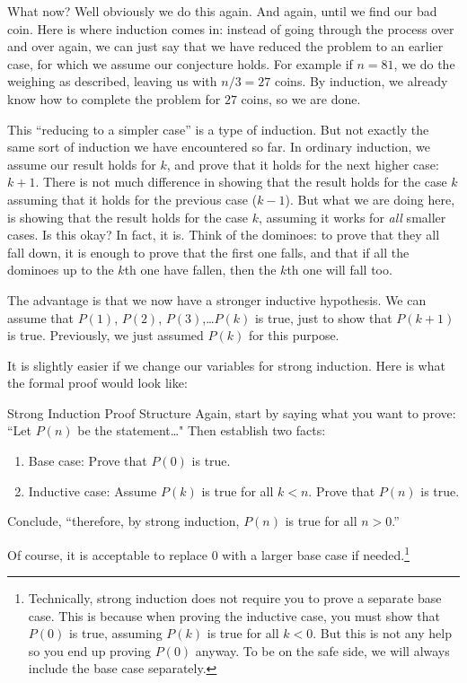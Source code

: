 \documentclass[12pt]{article}
\begin{document}
What now?  Well obviously we do this again.  And again, until we find our bad coin.  Here is where induction comes in: instead of going through the process over and over again, we can just say that we have reduced the problem to an earlier case, for which we assume our conjecture holds.  For example if $n =81$, we do the weighing as described, leaving us with $n/3 = 27$ coins.  By induction, we already know how to complete the problem for $27$ coins, so we are done.

This ``reducing to a simpler case'' is a type of induction.  But not exactly the same sort of induction we have encountered so far.  In ordinary induction, we assume our result holds for $k$, and prove that it holds for the next higher case: $k+1$.  There is not much difference in showing that the result holds for the case $k$ assuming that it holds for the previous case ($k-1$).  But what we are doing here, is showing that the result holds for the case $k$, assuming it works for {\em all} smaller cases.  Is this okay?  In fact, it is.  Think of the dominoes: to prove that they all fall down, it is enough to prove that the first one falls, and that if all the dominoes up to the $k$th one have fallen, then the $k$th one will fall too.

The advantage is that we now have a stronger inductive hypothesis.  We can assume that $P(1)$, $P(2)$, $P(3)$,\ldots $P(k)$ is true, just to show that $P(k+1)$ is true.  Previously, we just assumed $P(k)$ for this purpose.

It is slightly easier if we change our variables for strong induction.  Here is what the formal proof would look like:


\begin{defbox}{Strong Induction Proof Structure}
	Again, start by saying what you want to prove: ``Let $P(n)$ be the statement\ldots"  Then establish two facts:
	\begin{enumerate}
	\item Base case: Prove that $P(0)$ is true.
	\item Inductive case: Assume $P(k)$ is true for all $k < n$.  Prove that $P(n)$ is true.
	\end{enumerate}
	Conclude, ``therefore, by strong induction, $P(n)$ is true for all $n > 0$.''
\end{defbox}

Of course, it is acceptable to replace 0 with a larger base case if needed.\footnote{Technically, strong induction does not require you to prove a separate base case.  This is because when proving the inductive case, you must show that $P(0)$ is true, assuming $P(k)$ is true for all $k < 0$.  But this is not any help so you end up proving $P(0)$ anyway.  To be on the safe side, we will always include the base case separately.}
\end{document}
